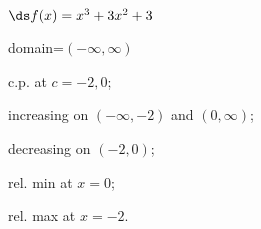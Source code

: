 {$\ds f(x) =x^3+3x^2+3$
}
{domain=$(-\infty,\infty)$

c.p. at $c=-2,0$; 

increasing on $(-\infty,-2)$ and $(0,\infty)$;

decreasing on $(-2,0)$;

rel. min at $x=0$;

rel. max at $x=-2$.
}
